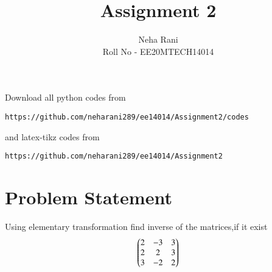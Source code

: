 \documentclass[journal,12pt,twocolumn]{IEEEtran}
\begin{document}
	\def\rightbox#1{\makebox[0in][r]{#1}}
	\def\centbox#1{\makebox[0in]{#1}}
	\def\topbox#1{\raisebox{-\baselineskip}[0in][0in]{#1}}
	\def\midbox#1{\raisebox{-0.5\baselineskip}[0in][0in]{#1}}
	\vspace{3cm}
\title{Assignment 2}
\author{Neha Rani \\Roll No - EE20MTECH14014}
\maketitle
\newpage
\bigskip
\renewcommand{\thefigure}{\theenumi}
\renewcommand{\thetable}{\theenumi}
Download all python codes from 
\begin{lstlisting}
https://github.com/neharani289/ee14014/Assignment2/codes
\end{lstlisting}
%
and latex-tikz codes from 
%
\begin{lstlisting}
https://github.com/neharani289/ee14014/Assignment2
\end{lstlisting}
%
\section{\textbf{Problem Statement}}
Using elementary transformation find inverse of the matrices,if it exist
\begin{align}
\begin{pmatrix}2 & -3 & 3\\ 2 & 2 & 3\\ 3 & -2 & 2\end{pmatrix}\\
\end{align}
	
\end{document}

